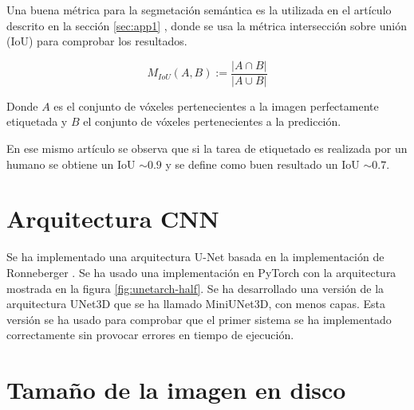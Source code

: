 
Una buena métrica para la segmetación semántica es la utilizada en el artículo descrito en la sección \ref{sec:app1} \cite{Falk2019}, donde se usa la métrica intersección sobre unión (IoU) para comprobar los resultados.

\begin{equation}
M_{IoU}(A, B) := \frac{|A\cap B|}{|A\cup B|}
\end{equation}

Donde $A$ es el conjunto de vóxeles pertenecientes a la imagen perfectamente etiquetada y $B$ el conjunto de vóxeles pertenecientes a la predicción.

En ese mismo artículo se observa que si la tarea de etiquetado es realizada por un humano se obtiene un IoU $\sim0.9$ y se define como buen resultado un IoU $\sim0.7$.


\pagebreak \section{Arquitectura CNN}\label{sec:choose_cnn_arch}

Se ha implementado una arquitectura U-Net basada en la implementación de Ronneberger \cite{Ronneberger2015}. Se ha usado una implementación en PyTorch \cite{shiba242017} con la arquitectura mostrada en la figura \ref{fig:unetarch-half}. Se ha desarrollado una versión de la arquitectura UNet3D que se ha llamado MiniUNet3D, con menos capas. Esta versión se ha usado para comprobar que el primer sistema se ha implementado correctamente sin provocar errores en tiempo de ejecución.


\section{Tamaño de la imagen en disco}\label{sec:disk_problem}

